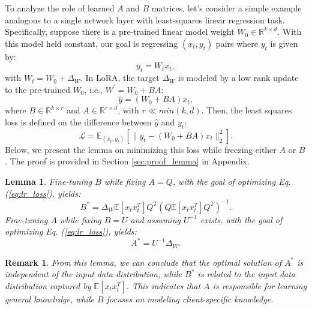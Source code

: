 \documentclass{article} %
\newtheorem{remark}{Remark}
\newtheorem{lemma}{Lemma}
\begin{document}
To analyze the role of learned $A$ and $B$ matrices, let's consider a simple example analogous to a single network layer with least-squares linear regression task. Specifically, suppose there is a pre-trained linear model weight $W_0 \in \mathbb{R}^{k \times d }$. 
With this model held constant, our goal is regressing $(x_t, y_t)$ pairs where $y_t$ is given by:
\begin{equation*}
    y_t = W_{t} x_t,
\end{equation*}
with $W_{t} = W_0 + \Delta_W$. In LoRA, the target $\Delta_W$ is modeled by a low rank update to the pre-trained $W_0$, i.e., $W^{\prime} = W_0 + BA$:
\begin{equation*}
    \hat{y} = (W_0 + BA) x_t,
\end{equation*}
where $B \in \mathbb{R}^{k \times r}$ and $A \in \mathbb{R}^{r \times d}$, with $r \ll min(k, d)$. Then, the least squares loss is defined on the difference between $\hat{y}$ and $y_{t}$:
\begin{equation} \label{eq:lr_loss}
    \mathcal{L} = \mathbb{E}_{(x_{t}, y_{t})}[\|y_{t} - (W_0 + BA) x_{t} \|_2^2].
\end{equation}
Below, we present the lemma on minimizing this loss while freezing either $A$ or $B$. The proof is provided in Section \ref{sec:proof_lemma} in Appendix.
\begin{lemma} \label{lemma:lora}
    Fine-tuning $B$ while fixing $A = Q$, with the goal of optimizing Eq. (\ref{eq:lr_loss}), yields:
    \begin{equation}
        B^* = \Delta_W\mathbb{E}[x_tx_t^T]Q^T (Q\mathbb{E}[x_tx_t^T]Q^T)^{-1}.
    \end{equation}
    Fine-tuning $A$ while fixing $B = U$ and assuming $U^{-1}$ exists, with the goal of optimizing Eq. (\ref{eq:lr_loss}), yields:
    \begin{equation}
        A^* = U^{-1}\Delta_W.
    \end{equation}
\end{lemma}

\begin{remark}
    From this lemma, we can conclude that the optimal solution of $A^*$ is independent of the input data distribution, while $B^*$ is related to the input data distribution captured by $\mathbb{E}[x_tx_t^T]$. This indicates that $A$ is responsible for learning general knowledge, while $B$ focuses on modeling client-specific knowledge.
\end{remark}
\end{document}
